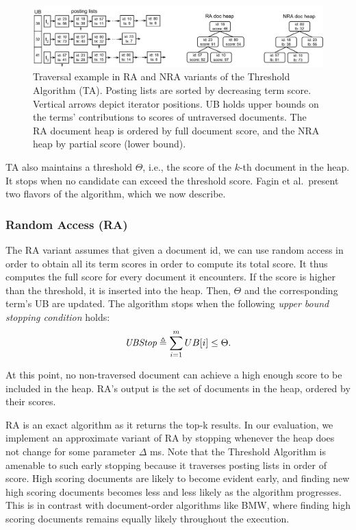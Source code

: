\begin{figure}[tbh]
\centering
\includegraphics[width=\linewidth]{figures/postingsLists}
\caption{Traversal example in  RA and NRA variants of the Threshold Algorithm (TA). Posting lists are sorted by decreasing term score. Vertical arrows depict  iterator positions.  UB  holds upper bounds on the terms' contributions to scores of untraversed documents. The RA document heap is ordered by full document score, and the NRA heap  by partial score (lower bound).}
\label{fig:lists}
\end{figure}

TA also maintains a threshold $\Theta$, i.e., the score of the $k$-th document in the heap.
It stops when no candidate can exceed the threshold score. 
Fagin et al.\ present two flavors of the algorithm, which we now describe.

\subsubsection{Random Access (RA)} 
The RA variant assumes that given a document id, we can use random access in order to obtain all its term scores in order to compute its total score. It thus computes the full score for every document it encounters. If the score is higher than the threshold, it is inserted into the heap. Then, $\Theta$ and the corresponding term's UB are updated. The algorithm stops when 
the following \emph{upper bound stopping condition} holds:
\begin{equation} \label{eq:stop}
\textit{UBStop} \triangleq \sum_{i=1}^m UB[i] \le \Theta.
\end{equation}

At this point, no non-traversed document can achieve a high enough score to be included in the heap. RA's output is the set of documents in the heap, ordered by their scores.

RA is an exact  algorithm as it returns the top-k results. In our evaluation, we implement an approximate variant of RA by stopping whenever the heap does not change for some parameter $\Delta$ ms. 
Note that the Threshold Algorithm is amenable to such early stopping because it traverses posting lists in order of score. High scoring documents are likely to become evident early, and finding new high scoring documents becomes less and less likely as the algorithm progresses. This is in contrast with document-order algorithms like BMW, where finding high scoring documents remains equally likely throughout the execution.

